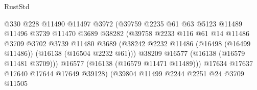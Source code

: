 \begin{lexlean}{RustStd}
\begin{coremodule}
                                          @330
                                          @228
                                          @11490
                                          @11497
                                          @3972
                                          (@39759
                                            @2235
                                            @61
                                            @63
                                            @5123
                                            @11489
                                            @11496
                                            @3739
                                            @11470
                                            @3689
                                            @38282
                                            (@39758
                                              @2233
                                              @116
                                              @61
                                              @14
                                              @11486
                                              @3709
                                              @3702
                                              @3739
                                              @11480
                                              @3689
                                              (@38242
                                                @2232
                                                @11486
                                                (@16498 (@16499 @11486))
                                                (@16138 (@16504 @2232 @61)))
                                              @38209
                                              @16577
                                              (@16138 (@16579 @11481 @3709)))
                                            @16577
                                            (@16138 (@16579 @11471 @11489)))
                                          @17634
                                          @17637
                                          @17640
                                          @17644
                                          @17649
                                          @39128)
                                        (@39804
                                          @11499
                                          @2244
                                          @2251
                                          @24
                                          @3709
                                          @11505

\end{coremodule}
\end{lexlean}
